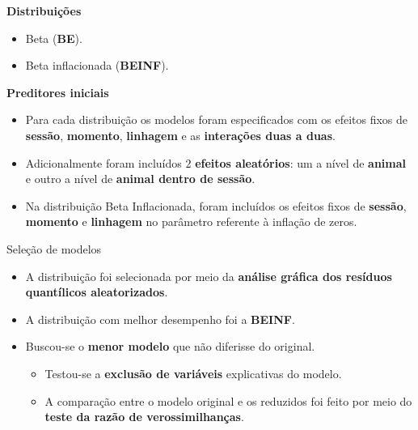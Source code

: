 \documentclass[
  ignorenonframetext,
  serif,
  professionalfont,
  usenames,
  dvipsnames,
  aspectratio = 169]{beamer}
\providecommand{\tightlist}{%
  \setlength{\itemsep}{0pt}\setlength{\parskip}{0pt}}
\renewcommand{\tightlist}{%
  \setlength{\itemsep}{0\baselineskip}
  \setlength{\parskip}{0.25\baselineskip}
}
\begin{document}
\begin{frame}{}
\protect\hypertarget{section}{}
\textbf{Distribuições}

\begin{itemize}
\tightlist
\item
  Beta (\textbf{BE}).
\item
  Beta inflacionada (\textbf{BEINF}).
\end{itemize}

\vspace{0.5cm}

\textbf{Preditores iniciais}

\begin{itemize}
\item
  Para cada distribuição os modelos foram especificados com os efeitos
  fixos de \textbf{sessão}, \textbf{momento}, \textbf{linhagem} e as
  \textbf{interações duas a duas}.
\item
  Adicionalmente foram incluídos 2 \textbf{efeitos aleatórios}: um a
  nível de \textbf{animal} e outro a nível de
  \textbf{animal dentro de sessão}.
\item
  Na distribuição Beta Inflacionada, foram incluídos os efeitos fixos de
  \textbf{sessão}, \textbf{momento} e \textbf{linhagem} no parâmetro
  referente à inflação de zeros.
\end{itemize}
\end{frame}

\begin{frame}{Seleção de modelos}
\protect\hypertarget{seleuxe7uxe3o-de-modelos-1}{}
\begin{itemize}
\item
  A distribuição foi selecionada por meio da
  \textbf{análise gráfica dos resíduos quantílicos aleatorizados}.
\item
  A distribuição com melhor desempenho foi a \textbf{BEINF}.
\item
  Buscou-se o \textbf{menor modelo} que não diferisse do original.

  \begin{itemize}
  \tightlist
  \item
    Testou-se a \textbf{exclusão de variáveis} explicativas do modelo.
  \item
    A comparação entre o modelo original e os reduzidos foi feito por
    meio do \textbf{teste da razão de verossimilhanças}.
  \end{itemize}
\end{itemize}
\end{frame}
\end{document}
